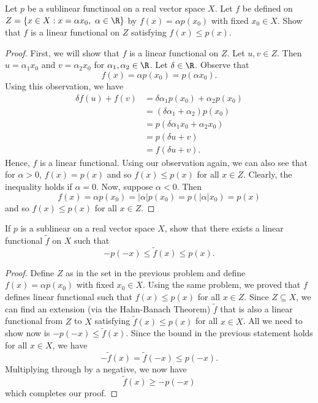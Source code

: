 \begin{problem}
    Let \( p  \) be a sublinear functinoal on a real vector space \( X  \). Let \( f  \) be defined on \( Z = \{  x \in X : x = \alpha {x}_{0} , \ \alpha \in \R  \}  \) by \( f(x) = \alpha p({x}_{0}) \) with fixed \( {x}_{0} \in X  \). Show that \( f  \) is a linear functional on \( Z  \) satisfying \( f(x) \leq p(x) \). 
\end{problem}
\begin{proof}
First, we will show that \( f  \) is a linear functional on \( Z  \). Let \( u, v \in Z  \). Then  \( u = {\alpha}_{1} {x}_{0} \) and \( v = {\alpha}_{2} {x}_{0} \) for \( {\alpha}_{1}, {\alpha}_{2} \in \R  \). Let \( \delta \in \R  \). Observe that  
\[ f(x) = \alpha p({x}_{0}) = p (\alpha {x}_{0}).  \]
Using this observation, we have 
\begin{align*}
    \delta f(u) + f(v) &= \delta {\alpha}_{1} p({x}_{0}) + {\alpha}_{2} p({x}_{0}) \\
                       &= (\delta {\alpha}_{1} + {\alpha}_{2}) p({x}_{0}) \\
                       &= p ( \delta {\alpha}_{1} {x}_{0} + {\alpha}_{2} {x}_{0}) \\
                       &= p(\delta u + v ) \\
                       &= f(\delta u + v).
\end{align*}
Hence, \( f  \) is a linear functional. Using our observation again, we can also see that for \( \alpha > 0 \), \( f(x) = p(x) \) and so \( f(x) \leq p(x) \) for all \( x \in Z  \). Clearly, the inequality holds if \( \alpha = 0  \). Now, suppose \( \alpha < 0  \). Then 
\[  f(x) = \alpha p({x}_{0}) = | \alpha | p({x}_{0}) = p (| \alpha | {x}_{0}) = p(x) \]
and so \( f(x) \leq p(x) \) for all \( x \in Z  \).
\end{proof}

\begin{problem}
    If \( p  \) is a sublinear on a real vector space \( X  \), show that there exists a linear functional \( \tilde{f} \) on \( X  \) such that  
    \[  -p(-x) \leq \tilde{f}(x) \leq p(x). \]
\end{problem}
\begin{proof}
    Define \( Z  \) as in the set in the previous problem and define \( f(x) = \alpha p({x}_{0}) \) with fixed \( {x}_{0} \in X  \). Using the same problem, we proved that \( f  \) defines linear functional such that \( f(x) \leq p(x) \) for all \( x \in Z \). Since \( Z \subseteq X  \), we can find an extension (via the Hahn-Banach Theorem) \( \tilde{f} \) that is also a linear functional from \( Z  \) to \( X  \) satisfying \( \tilde{f}(x) \leq p(x) \) for all \( x \in X  \). All we need to show now is \( -p(-x) \leq \tilde{f}(x) \). Since the bound in the previous statement holds for all \( x \in X  \), we have   
    \[   - \tilde{f}(x) = \tilde{f}(-x) \leq p(-x). \]
    Multiplying through by a negative, we now have 
    \[  \tilde{f}(x) \geq - p(-x) \]
    which completes our proof.
\end{proof}
